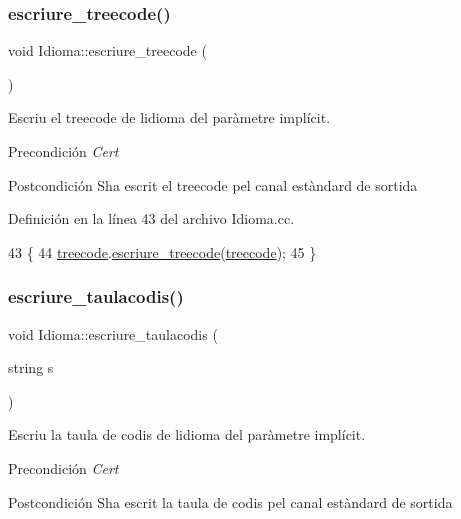 \subsubsection{\texorpdfstring{escriure\+\_\+treecode()}{escriure\_treecode()}}
{\footnotesize\ttfamily void Idioma\+::escriure\+\_\+treecode (\begin{DoxyParamCaption}{ }\end{DoxyParamCaption})}



Escriu el treecode de l\textquotesingle{}idioma del paràmetre implícit. 

\begin{DoxyPrecond}{Precondición}
{\itshape Cert} 
\end{DoxyPrecond}
\begin{DoxyPostcond}{Postcondición}
S\textquotesingle{}ha escrit el treecode pel canal estàndard de sortida 
\end{DoxyPostcond}


Definición en la línea 43 del archivo Idioma.\+cc.


\begin{DoxyCode}
43                                \{
44     \hyperlink{class_idioma_ab80d7ef5fec4c922bc65e97e6e3bf968}{treecode}.\hyperlink{class_treecode_acfa6c1b465b514251f7101b61195d50f}{escriure\_treecode}(\hyperlink{class_idioma_ab80d7ef5fec4c922bc65e97e6e3bf968}{treecode});
45 \}
\end{DoxyCode}
\mbox{\label{class_idioma_a4f1102ff409d13738ff09268e8e045da}} 
\subsubsection{\texorpdfstring{escriure\+\_\+taulacodis()}{escriure\_taulacodis()}}
{\footnotesize\ttfamily void Idioma\+::escriure\+\_\+taulacodis (\begin{DoxyParamCaption}\item[{string}]{s }\end{DoxyParamCaption})}



Escriu la taula de codis de l\textquotesingle{}idioma del paràmetre implícit. 

\begin{DoxyPrecond}{Precondición}
{\itshape Cert} 
\end{DoxyPrecond}
\begin{DoxyPostcond}{Postcondición}
S\textquotesingle{}ha escrit la taula de codis pel canal estàndard de sortida 
\end{DoxyPostcond}


